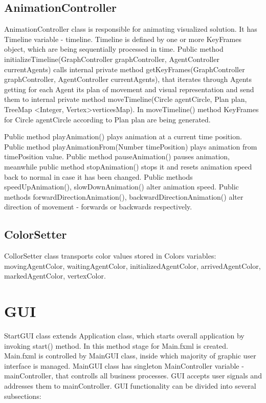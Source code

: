 \documentclass[thesis=B,english]{FITthesis}[2019/12/23]
\begin{document}
\subsection{AnimationController}

AnimationController class is responsible for animating visualized solution. It has Timeline variable - timeline. Timeline is defined by one or more KeyFrames object, which are being sequentially processed in time. Public method initializeTimeline(GraphController graphController, AgentController currentAgents) calls internal private method getKeyFrames(GraphController graphController, AgentController currentAgents), that iterates through Agents getting for each Agent its plan of movement and visual representation and send them to internal private method moveTimeline(Circle agentCircle, Plan plan, TreeMap \textless Integer, Vertex\textgreater verticesMap). In moveTimeline() method KeyFrames for Circle agentCircle according to Plan plan are being generated.

Public method playAnimation() plays animation at a current time position.
Public method playAnimationFrom(Number timePosition) plays animation from timePosition value. Public method pauseAnimation() pauses animation, meanwhile public method stopAnimation() stops it and resets animation speed back to normal in case it has been changed. Public methods speedUpAnimation(), slowDownAnimation() alter animation speed. Public methods forwardDirectionAnimation(), backwardDirectionAnimation() alter direction of movement - forwards or backwards respectively.

\subsection{ColorSetter}

CollorSetter class transports color values stored in Colors variables: movingAgentColor, waitingAgentColor, initializedAgentColor, arrivedAgentColor, markedAgentColor, vertexColor. 

\section{GUI}

StartGUI class extends Application class, which starts overall application by invoking start() method. In this method stage for Main.fxml is created. Main.fxml is controlled by MainGUI class, inside which majority of graphic user interface is managed. MainGUI class has singleton MainController variable - mainController, that controlls all business processes. GUI accepts user signals and addresses them to mainController. GUI functionality can be divided into several subsections:
\end{document}

